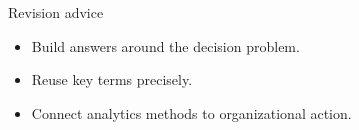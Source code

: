 \documentclass[aspectratio=169,11pt]{beamer}
\begin{document}

\begin{frame}{Revision advice}
  \begin{itemize}
    \item Build answers around the decision problem.
    \item Reuse key terms precisely.
    \item Connect analytics methods to organizational action.
  \end{itemize}
\end{frame}
\end{document}
